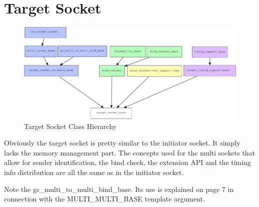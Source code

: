 \documentclass[a4paper,10pt]{article}          %
\newcommand{\code}[1]{{\ttfamily#1}}
\begin{document}
\section{Target Socket}

\begin{figure}[htbp]
\begin{center}
\includegraphics[scale=0.4]{tsockch}
\caption{Target Socket Class Hierarchy}
\label{fig:tsockch}
\end{center}
\end{figure}

Obviously the target socket is pretty similar to the initiator socket. It simply lacks the memory management part. The concepts used for the multi sockets that allow for sender identification, the bind check, the extension API and the timing info distribution are all the same as in the initiator socket.

Note the \code{gs\_multi\_to\_multi\_bind\_base}. Its use is explained on page 7 in connection with the \code{MULTI\_MULTI\_BASE} template argument.
\end{document}
